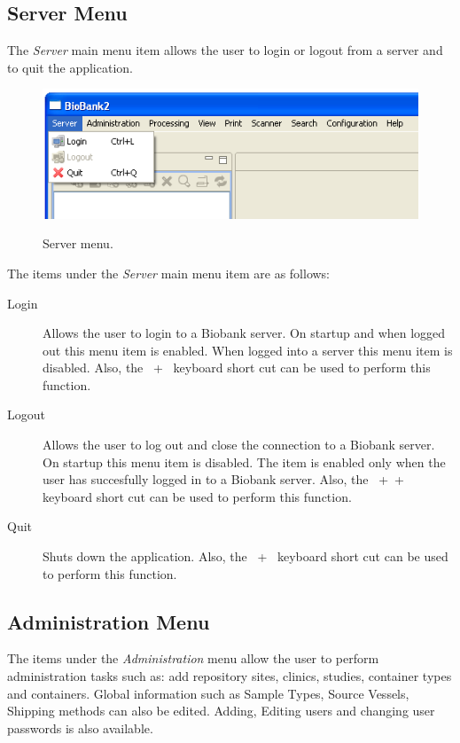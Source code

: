 \subsection{Server Menu}
The \emph{Server} main menu item allows the user to login or logout from a
server and to quit the application.
\begin{figure}[H]
  \centering
  \scalebox{0.5}
	   { \includegraphics*{screenshots/overview/main_menu_server} }
	   \caption{Server menu.}
	   \label{fig:main_menu_server}
\end{figure}
The items under the \emph{Server} main menu item are as follows:
\begin{description}
\item[Login] Allows the user to login to a Biobank server. On startup and
  when logged out this menu item is enabled. When logged into a server this
  menu item is disabled. Also, the \mbox{ + } keyboard
  short cut can be used to perform this function.
\item[Logout] Allows the user to log out and close the connection to a
  Biobank server. On startup this menu item is disabled. The item is enabled
  only when the user has succesfully logged in to a Biobank server. Also,
  the \mbox{ +  + } keyboard short cut can be
  used to perform this function.
\item[Quit] Shuts down the application. Also, the \mbox{ +
  } keyboard short cut can be used to perform this function.
\end{description}
\clearpage

\subsection{Administration Menu}
The items under the \emph{Administration} menu allow the user to perform
administration tasks such as: add repository sites, clinics, studies, container
types and containers. Global information such as Sample Types, Source Vessels,
Shipping methods can also be edited. Adding, Editing users and changing user
passwords is also available.

